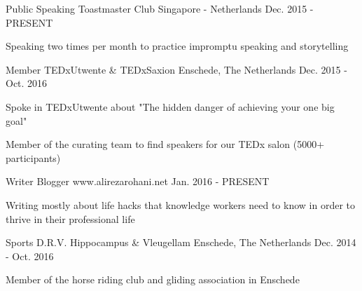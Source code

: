 

\begin{cventries}

  \cventry
    {Public Speaking} %
    {Toastmaster Club} %
    {Singapore - Netherlands} %
    {Dec. 2015 - PRESENT} %
    {
      \begin{cvitems} %
        \item {Speaking two times per month to practice impromptu speaking and storytelling}
      \end{cvitems}
    }

  \cventry
    {Member} %
    {TEDxUtwente \& TEDxSaxion} %
    {Enschede, The Netherlands} %
    {Dec. 2015 - Oct. 2016} %
    {
      \begin{cvitems} %
        \item {Spoke in TEDxUtwente about "The hidden danger of achieving your one big goal" }
        \item {Member of the curating team to find speakers for our TEDx salon (5000+ participants)}
      \end{cvitems}
    }

  \cventry
    {Writer} %
    {Blogger} %
    {www.alirezarohani.net} %
    {Jan. 2016 - PRESENT} %
    {
      \begin{cvitems} %
        \item {Writing mostly about life hacks that knowledge workers need to know in order to thrive in their professional life}
       \end{cvitems}
    }

  \cventry
    {Sports} %
    {D.R.V. Hippocampus \& Vleugellam } %
    {Enschede, The Netherlands} %
    {Dec. 2014 - Oct. 2016} %
    {
      \begin{cvitems} %
        \item {Member of the horse riding club and gliding association in Enschede }
      \end{cvitems}
    }

\end{cventries}
